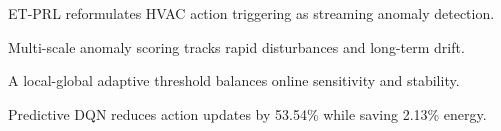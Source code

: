 \begin{highlights}
\item ET-PRL reformulates HVAC action triggering as streaming anomaly detection.
\item Multi-scale anomaly scoring tracks rapid disturbances and long-term drift.
\item A local-global adaptive threshold balances online sensitivity and stability.
\item Predictive DQN reduces action updates by 53.54\% while saving 2.13\% energy.
\end{highlights}
